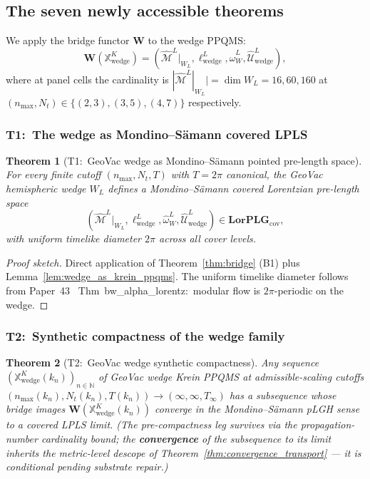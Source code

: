 \documentclass[11pt,a4paper]{article}
\theoremstyle{plain}
\newtheorem{theorem}{Theorem}[section]
\theoremstyle{definition}
\newcommand{\nmax}{n_{\max}}
\newcommand{\Nt}{N_{t}}
\newcommand{\Mcal}{\mathcal{M}}
\newcommand{\Ucal}{\mathcal{U}}
\newcommand{\N}{\mathbb{N}}
\newcommand{\Wfun}{\mathbf{W}}
\newcommand{\LorPLG}{\mathbf{LorPLG}_{\mathrm{cov}}}
\begin{document}
\subsection{The seven newly accessible theorems}\label{sec:seven_theorems}

We apply the bridge functor $\Wfun$ to the wedge PPQMS:
\[
\Wfun(\mathbb{X}^{K}_{\mathrm{wedge}}) =
(\hat{\Mcal}^{L}|_{W_{L}}, \ell^{L}_{\mathrm{wedge}},
\hat{\omega}_{W}^{L}, \hat{\Ucal}^{L}_{\mathrm{wedge}}),
\]
where at panel cells the cardinality is $|\hat{\Mcal}^{L}|_{W_{L}}|
= \dim W_{L} = 16, 60, 160$ at $(\nmax, \Nt) \in \{(2, 3), (3, 5),
(4, 7)\}$ respectively.

\subsubsection{T1:\ The wedge as Mondino--S\"amann covered
LPLS}\label{sec:t1_wedge_as_lpls}

\begin{theorem}[T1:\ GeoVac wedge as Mondino--S\"amann pointed
pre-length space]\label{thm:wedge_as_lpls}
For every finite cutoff $(\nmax, \Nt, T)$ with $T = 2\pi$ canonical,
the GeoVac hemispheric wedge $W_{L}$ defines a Mondino--S\"amann
covered Lorentzian pre-length space
\[
(\hat{\Mcal}^{L}|_{W_{L}}, \ell^{L}_{\mathrm{wedge}},
\hat{\omega}_{W}^{L}, \hat{\Ucal}^{L}_{\mathrm{wedge}})
\in \LorPLG,
\]
with uniform timelike diameter $2\pi$ across all cover levels.
\end{theorem}

\begin{proof}[Proof sketch]
Direct application of Theorem~\ref{thm:bridge} (B1) plus
Lemma~\ref{lem:wedge_as_krein_ppqms}. The uniform timelike diameter
follows from Paper~43~\cite{paper43} Thm~bw\_alpha\_lorentz:\ modular
flow is $2\pi$-periodic on the wedge.
\end{proof}

\subsubsection{T2:\ Synthetic compactness of the wedge
family}\label{sec:t2_synthetic_compactness}

\begin{theorem}[T2:\ GeoVac wedge synthetic
compactness]\label{thm:synthetic_compactness}
Any sequence $(\mathbb{X}^{K}_{\mathrm{wedge}}(k_{n}))_{n \in \N}$
of GeoVac wedge Krein PPQMS at admissible-scaling cutoffs
$(\nmax(k_{n}), \Nt(k_{n}), T(k_{n})) \to (\infty, \infty,
T_{\infty})$ has a subsequence whose bridge images
$\Wfun(\mathbb{X}^{K}_{\mathrm{wedge}}(k_{n}))$ converge in the
Mondino--S\"amann pLGH sense to a covered LPLS limit. \emph{(The
pre-compactness leg survives via the propagation-number cardinality
bound; the \textbf{convergence} of the subsequence to its limit inherits
the metric-level descope of Theorem~\ref{thm:convergence_transport} --- it
is conditional pending substrate repair.)}
\end{theorem}
\end{document}
